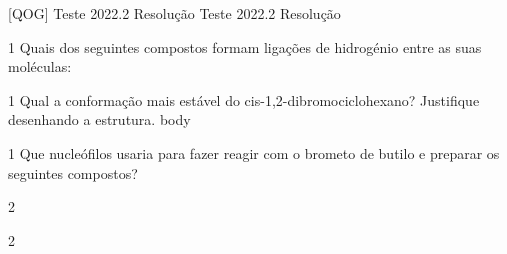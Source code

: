 \documentclass[\mainfilename]{subfiles}
\begin{document}

[QOG]
{Teste 2022.2 Resolução} %
{Teste 2022.2 Resolução} %


\begin{questionBox}1{ %
    Quais dos seguintes compostos formam ligações de hidrogénio entre as suas moléculas:
} %
    \begin{enumerate}
        \begin{multicols}{3}
            \item {}
            \item {}
            \item {}
        \end{multicols}
    \end{enumerate}
\end{questionBox}

\begin{questionBox}1{ %
    Qual a conformação mais estável do cis-1,2-dibromociclohexano? Justifique desenhando a estrutura.
} %
    body
\end{questionBox}

\begin{questionBox}1{ %
    Que nucleófilos usaria para fazer reagir com o brometo de butilo e preparar os seguintes compostos?
} %
    \begin{questionBox}2{ %
    } %
        \begin{center}
        \end{center}
    \end{questionBox}

    \begin{questionBox}2{ %
    } %
        \begin{center}
        \end{center}
    \end{questionBox}
\end{questionBox}
\end{document}

